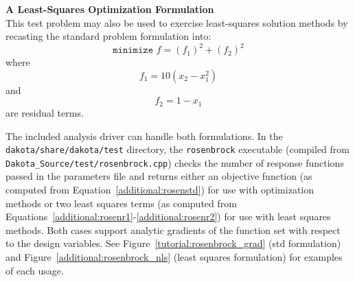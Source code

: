 {\bf A Least-Squares Optimization Formulation} \\
This test problem
may also be used to exercise least-squares solution methods by
recasting the standard problem formulation into:
\begin{equation}
\texttt{minimize } f = (f_1)^2+(f_2)^2 \label{additional:rosenls}
\end{equation}
where
\begin{equation}
f_1 = 10 (x_2 - x_1^2) \label{additional:rosenr1}
\end{equation}
and
\begin{equation}
f_2 = 1 - x_1 \label{additional:rosenr2}
\end{equation}
are residual terms.

The included analysis driver can handle both formulations.
In the \texttt{dakota/share/dakota/test} directory, the \texttt{rosenbrock}
executable (compiled from \texttt{Dakota\_Source/test/rosenbrock.cpp}) checks the number of
response functions passed in the parameters file and returns either an
objective function (as computed from
Equation~\ref{additional:rosenstd}) for use with optimization methods
or two least squares terms (as computed from
Equations~\ref{additional:rosenr1}-\ref{additional:rosenr2}) for use
with least squares methods. Both cases support analytic gradients of
the function set with respect to the design variables.
See Figure~\ref{tutorial:rosenbrock_grad} (std formulation)
and Figure~\ref{additional:rosenbrock_nls} (least squares formulation)
for examples of each usage.


